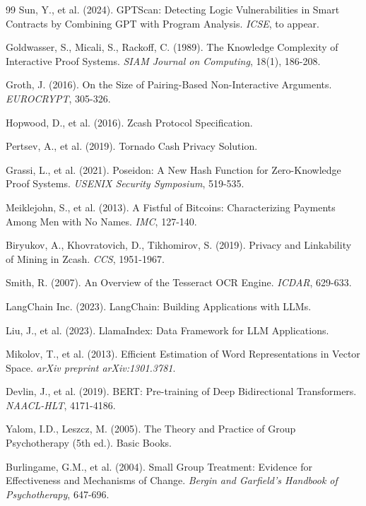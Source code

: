 \documentclass[12pt,a4paper,twoside]{book}
\begin{document}
\begin{thebibliography}{99}
Sun, Y., et al. (2024).
GPTScan: Detecting Logic Vulnerabilities in Smart Contracts by Combining GPT with Program Analysis.
\textit{ICSE}, to appear.

Goldwasser, S., Micali, S., Rackoff, C. (1989).
The Knowledge Complexity of Interactive Proof Systems.
\textit{SIAM Journal on Computing}, 18(1), 186-208.

Groth, J. (2016).
On the Size of Pairing-Based Non-Interactive Arguments.
\textit{EUROCRYPT}, 305-326.

Hopwood, D., et al. (2016).
Zcash Protocol Specification.

Pertsev, A., et al. (2019).
Tornado Cash Privacy Solution.

Grassi, L., et al. (2021).
Poseidon: A New Hash Function for Zero-Knowledge Proof Systems.
\textit{USENIX Security Symposium}, 519-535.

Meiklejohn, S., et al. (2013).
A Fistful of Bitcoins: Characterizing Payments Among Men with No Names.
\textit{IMC}, 127-140.

Biryukov, A., Khovratovich, D., Tikhomirov, S. (2019).
Privacy and Linkability of Mining in Zcash.
\textit{CCS}, 1951-1967.

Smith, R. (2007).
An Overview of the Tesseract OCR Engine.
\textit{ICDAR}, 629-633.

LangChain Inc. (2023).
LangChain: Building Applications with LLMs.

Liu, J., et al. (2023).
LlamaIndex: Data Framework for LLM Applications.

Mikolov, T., et al. (2013).
Efficient Estimation of Word Representations in Vector Space.
\textit{arXiv preprint arXiv:1301.3781}.

Devlin, J., et al. (2019).
BERT: Pre-training of Deep Bidirectional Transformers.
\textit{NAACL-HLT}, 4171-4186.

Yalom, I.D., Leszcz, M. (2005).
The Theory and Practice of Group Psychotherapy (5th ed.).
Basic Books.

Burlingame, G.M., et al. (2004).
Small Group Treatment: Evidence for Effectiveness and Mechanisms of Change.
\textit{Bergin and Garfield's Handbook of Psychotherapy}, 647-696.


\end{thebibliography}
\end{document}

